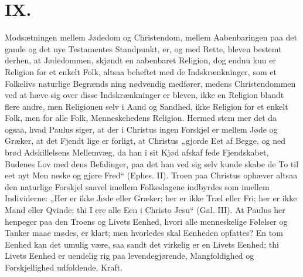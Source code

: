 \documentclass[12pt]{book}
\newcommand{\opage}[1]{\marginnote{\footnotesize\textit{[#1]}}}
\begin{document}
\chapter*{IX.}
\label{ch:ix}
\opage{135}\setcounter{footnote}{0}%
Modsætningen mellem Jødedom og Christendom, mellem
Aabenbaringen paa det gamle og det nye Testamentes
Standpunkt, er, og med Rette, bleven bestemt derhen, at
Jødedommen, skjøndt en aabenbaret Religion, dog endnu
kun er Religion for et enkelt Folk, altsaa beheftet med
de Indskrænkninger, som et Folkelivs naturlige Begrænds\-%
ning nødvendig medfører, medens Christendommen ved
at hæve sig over disse Indskrænkninger er bleven, ikke
en Religion blandt flere andre, men Religionen selv i
Aand og Sandhed, ikke Religion for et enkelt Folk, men
for alle Folk, Menneskehedens Religion. Hermed stem\-%
mer det da ogsaa, hvad Paulus siger, at der i Christus
ingen Forskjel er mellem Jøde og Græker, at det Fjendt\-%
lige er forligt, at Christus „gjorde Eet af Begge, og ned\-%
brød Adskillelsens Mellemvæg, da han i sit Kjød afskaf\-%
fede Fjendskabet, Budenes Lov med dens Befalinger, paa
det han ved sig selv kunde skabe de To til eet nyt Men\-%
neske og gjøre Fred“ (Ephes. II). Troen paa Christus
ophæver altsaa den naturlige Forskjel saavel imellem
Folkeslagene indbyrdes som imellem Individerne: „Her
er ikke Jøde eller Græker; her er ikke Træl eller Fri;
her er ikke Mand eller Qvinde; thi I ere alle Een i
Christo Jesu“ (Gal. III). At Paulus her henpeger paa
\opage{136}\setcounter{footnote}{0}%
den Troens og Livets Eenhed, hvori alle menneskelige
Følelser og Tanker maae mødes, er klart; men hvorledes
skal Eenheden opfattes? En tom Eenhed kan det umulig
være, saa sandt det virkelig er en Livets Eenhed; thi
Livets Eenhed er uendelig rig paa levendegjørende,
Mangfoldighed og Forskjellighed udfoldende, Kraft.
\end{document}
